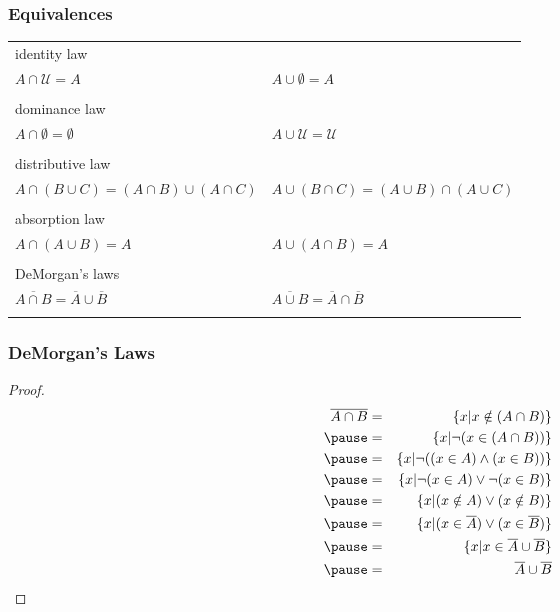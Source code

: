 \documentclass[dvipsnames]{beamer}
\begin{document}
\begin{frame}
  \frametitle{Equivalences}

  \begin{tabular}{ll}
    \alert{identity law} &\\
      $A \cap \mathcal{U} = A$ &
      $A \cup \emptyset = A$\\\\
    \pause
    \alert{dominance law} &\\
      $A \cap \emptyset = \emptyset$ &
      $A \cup \mathcal{U} = \mathcal{U}$\\\\
    \pause
    \alert{distributive law} &\\
      $A \cap (B \cup C) = (A \cap B) \cup (A \cap C)$ &
      $A \cup (B \cap C) = (A \cup B) \cap (A \cup C)$\\\\
    \pause
    \alert{absorption law} &\\
      $A \cap (A \cup B) = A$ &
      $A \cup (A \cap B) = A$\\\\
    \pause
    \alert{DeMorgan's laws} &\\
      $\overline{A \cap B} = \overline{A} \cup \overline{B}$ &
      $\overline{A \cup B} = \overline{A} \cap \overline{B}$\\\\
  \end{tabular}
\end{frame}

\begin{frame}
  \frametitle{DeMorgan's Laws}

  \begin{proof}
    \begin{eqnarray*}
      \overline{A \cap B} & = & \{x | x \notin (A \cap B)\}\\\pause
                          & = & \{x | \neg (x \in (A \cap B))\}\\\pause
                          & = & \{x | \neg ((x \in A) \wedge (x \in B))\}\\\pause
                          & = & \{x | \neg (x \in A) \vee \neg (x \in B)\}\\\pause
                          & = & \{x | (x \notin A) \vee (x \notin B)\}\\\pause
                          & = & \{x | (x \in \overline{A}) \vee (x \in \overline{B})\}\\\pause
                          & = & \{x | x \in \overline{A} \cup \overline{B}\}\\\pause
                          & = & \overline{A} \cup \overline{B}
    \end{eqnarray*}
  \end{proof}
\end{frame}
\end{document}
